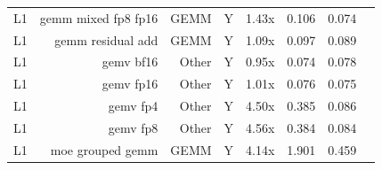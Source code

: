 \begin{table}[t]
\begin{tabular}{lrrrrrrr}
L1 & gemm mixed fp8 fp16 & GEMM & Y & 1.43x & 0.106 & 0.074 &  \\
L1 & gemm residual add & GEMM & Y & 1.09x & 0.097 & 0.089 &  \\
L1 & gemv bf16 & Other & Y & 0.95x & 0.074 & 0.078 &  \\
L1 & gemv fp16 & Other & Y & 1.01x & 0.076 & 0.075 &  \\
L1 & gemv fp4 & Other & Y & 4.50x & 0.385 & 0.086 &  \\
L1 & gemv fp8 & Other & Y & 4.56x & 0.384 & 0.084 &  \\
L1 & moe grouped gemm & GEMM & Y & 4.14x & 1.901 & 0.459 &  \\
\bottomrule
\end{tabular}
\end{table}
